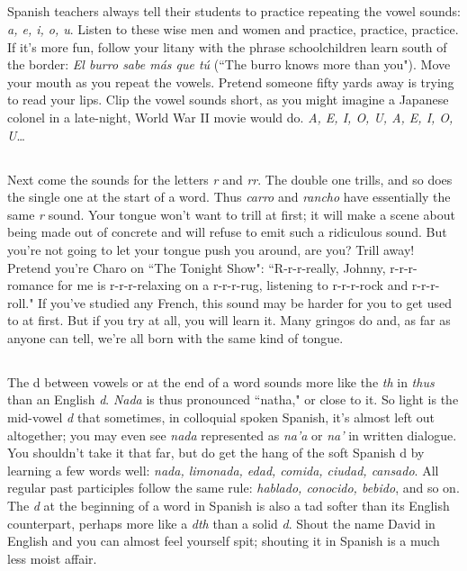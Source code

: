 \subsection{}

Spanish teachers always tell their students to practice repeating the vowel sounds: \emph{a, e, i, o, u}. Listen to these wise men and
women and practice, practice, practice. If it's more fun, follow your
litany with the phrase schoolchildren learn south of the border: \emph{El burro sabe más que tú} (``The burro knows more than you"). Move your
mouth as you repeat the vowels. Pretend someone fifty yards away is
trying to read your lips. Clip the vowel sounds short, as you might
imagine a Japanese colonel in a late-night, World War II movie would
do. \emph{A, E, I, O, U, A, E, I, O, U}\ldots{}

\subsection{}

Next come the sounds for the letters \emph{r} and \emph{rr}. The double
one trills, and so does the single one at the start of a word. Thus \emph{carro}
and \emph{rancho} have essentially the same \emph{r} sound. Your tongue won't want
to trill at first; it will make a scene about being made out of concrete
and will refuse to emit such a ridiculous sound. But you're not going to
let your tongue push you around, are you? Trill away! Pretend you're
Charo on ``The Tonight Show": ``R-r-r-really, Johnny, r-r-r-romance for
me is r-r-r-relaxing on a r-r-r-rug, listening to r-r-r-rock and r-r-r-roll." If
you've studied any French, this sound may be harder for you to get
used to at first. But if you try at all, you will learn it. Many gringos do
and, as far as anyone can tell, we're all born with the same kind of
tongue.

\subsection{}

The d between vowels or at the end of a word sounds more
like the \emph{th} in \emph{thus} than an English \emph{d}. \emph{Nada} is thus pronounced ``natha," or close to it. So light is the mid-vowel \emph{d} that sometimes, in colloquial spoken Spanish, it's almost left out altogether; you may even
see \emph{nada} represented as \emph{na'a} or \emph{na'} in written dialogue. You shouldn't
take it that far, but do get the hang of the soft Spanish d by learning a
few words well: \emph{nada, limonada, edad, comida, ciudad, cansado}. All
regular past participles follow the same rule: \emph{hablado, conocido, bebido}, and so on. The \emph{d} at the beginning of a word in Spanish is also a
tad softer than its English counterpart, perhaps more like a \emph{dth} than a
solid \emph{d}. Shout the name David in English and you can almost feel
yourself spit; shouting it in Spanish is a much less moist affair.

